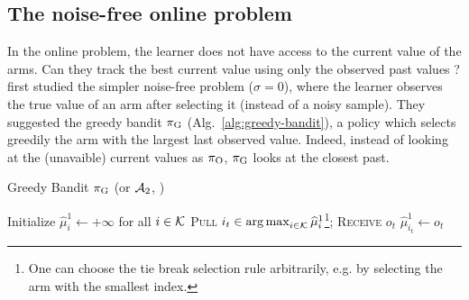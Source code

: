 \subsection{The noise-free online problem \citep{heidari2016tight}}
In the online problem, the learner does not have access to the current value of the arms. Can they track the best current value using only the observed past values ?  \citet{heidari2016tight} first studied the simpler noise-free problem ($\sigma =0$), where the learner observes the true value of an arm after selecting it (instead of a noisy sample). They suggested the greedy bandit $\pi_{\rm G}$ (Alg.~\ref{alg:greedy-bandit}), a policy which selects greedily the arm with the largest last observed value. Indeed, instead of looking at the (unavaible) current values as $\pi_{\rm O}$, $\pi_{\rm G}$ looks at the closest past. 

\begin{minipage}{\textwidth}
\renewcommand*\footnoterule{}
\begin{savenotes}
\begin{algorithm}[H]
\caption{Greedy Bandit $\pi_{\rm G}$ (or $\mathcal{A}_{\rm 2}$, \citet{heidari2016tight})}
\label{alg:greedy-bandit}
\begin{algorithmic}[1]
\State Initialize $\hat{\mu}_{i}^1 \leftarrow + \infty$ for all $i \in \mathcal{K}$
		\State \textsc{Pull} $i_t \in \operatorname*{arg\,max}_{i \in \mathcal{K}} \widehat{\mu}_{i}^1$\footnote{One can choose the tie break selection rule arbitrarily, e.g. by selecting the arm with the smallest index.}; \textsc{Receive} $o_{t}$
		\State $\hat{\mu}_{i_t}^1 \leftarrow o_{t}$
	\EndFor
\end{algorithmic}
\end{algorithm}
\end{savenotes}
\end{minipage}


